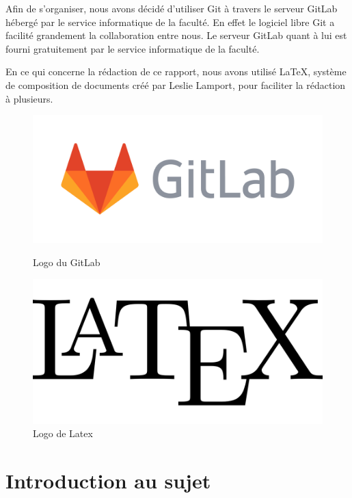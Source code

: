 \documentclass[oneside,13pt,a4paper]{report}
\begin{document}
Afin de s'organiser, nous avons décidé d'utiliser Git à travers le serveur GitLab hébergé par le service informatique de la faculté. En effet le logiciel libre Git a facilité grandement la collaboration entre nous. Le serveur GitLab quant à lui est fourni gratuitement par le service informatique de la faculté.

En ce qui concerne la rédaction de ce rapport, nous avons utilisé \LaTeX, système de composition de documents créé par Leslie Lamport, pour faciliter la rédaction à plusieurs.

\begin{figure}[h]
	\begin{minipage}[c]{.46\linewidth}
		\centering
		\includegraphics[width=1\textwidth]{img/gitlab.png}
		\caption{Logo du GitLab}
	\end{minipage}
	\hfill%
	\begin{minipage}[c]{.46\linewidth}
		\centering
		\includegraphics[width=1\textwidth]{img/latex.png}
		\caption{Logo de Latex}
	\end{minipage}
\end{figure}



\chapter{Introduction au sujet}
\end{document}
